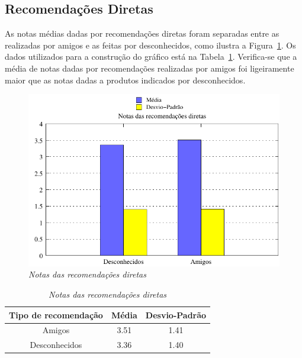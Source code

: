 \subsection{Recomendações Diretas}

 As notas médias dadas por recomendações diretas foram separadas entre as realizadas por amigos e as feitas por desconhecidos, como ilustra a Figura~\ref{fig:notas_medias_diretas}. Os dados utilizados para a construção do gráfico está na Tabela~\ref{table:notas_medias_diretas}. Verifica-se que a média de notas dadas por recomendações realizadas por amigos foi ligeiramente maior que as notas dadas a produtos indicados por desconhecidos.

\begin{figure}
    \centering
    \includegraphics[width=\textwidth]{imagens/grafico_notas_medias_diretas}
    \caption{\it Notas das recomendações diretas}
    \label{fig:notas_medias_diretas}
\end{figure}

\begin{table}
\centering
\begin{tabular}{c c c}
    \hline \hline
    \textbf{Tipo de recomendação} & \textbf{Média}& \textbf{Desvio-Padrão} \\
\hline 
Amigos & 3.51 & 1.41 \\
\hline 
Desconhecidos & 3.36 & 1.40 \\
\hline        
\end{tabular}
\caption{\it Notas das recomendações diretas}
\label{table:notas_medias_diretas}
\end{table}


